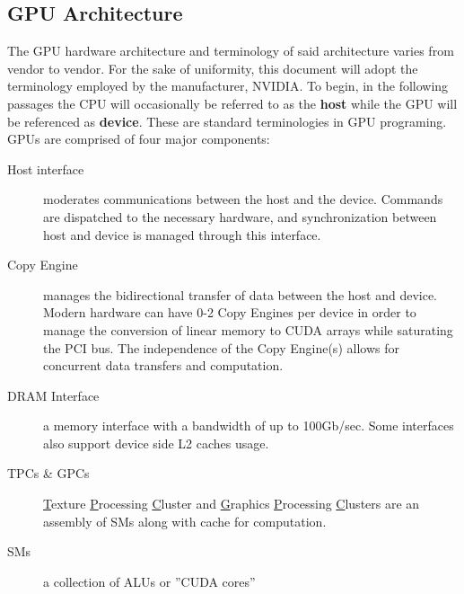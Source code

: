 \subsection{GPU Architecture}\label{ssec:gpu_architecture}
The GPU hardware architecture and terminology of said architecture varies from
vendor to vendor.  For the sake of uniformity, this document will adopt the
terminology employed by the manufacturer, NVIDIA.  To begin, in the following passages the CPU
will occasionally be referred to as the \textbf{host} while the GPU will be referenced as \textbf{device}.
These are standard terminologies in GPU programing. GPUs are comprised of four major components:
\begin{description}
  \item[Host interface] moderates communications between the host and the device.
  Commands are dispatched to the necessary hardware, and synchronization between
  host and device is managed through this interface.
  \item[Copy Engine] manages the bidirectional transfer of data between the host
  and device.  Modern hardware can have 0-2 Copy Engines per device in order to
  manage the conversion of linear memory to CUDA arrays while saturating the PCI
  bus.  The independence of the Copy Engine(s) allows for concurrent data transfers
  and computation.
  \item[DRAM Interface] a memory interface with a bandwidth of up to 100Gb/sec\cite{Wilt}.
  Some interfaces also support device side L2 caches usage.
  \item[TPCs \& GPCs] \underline{T}exture \underline{P}rocessing \underline{C}luster
  and \underline{G}raphics \underline{P}rocessing \underline{C}lusters are an assembly
  of \Glspl{SM} along with cache for computation.
  \item[\Glspl{SM}] a collection of \Glspl{ALU} or ''CUDA cores''
\end{description}\cite{Wilt}

